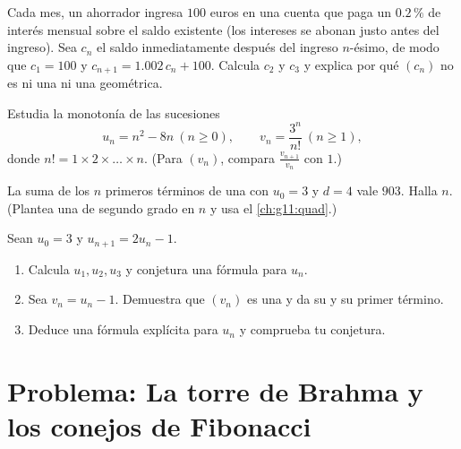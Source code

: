 \begin{exercise}[$\star\star$]\label{exo:g11:seq:8}
Cada mes, un ahorrador ingresa $100$ euros en una cuenta que paga un
$0.2\,\%$ de interés mensual sobre el saldo existente (los intereses se
abonan justo antes del ingreso). Sea $c_n$ el saldo inmediatamente después
del ingreso $n$-ésimo, de modo que $c_1 = 100$ y
$c_{n+1} = 1.002\,c_n + 100$. Calcula $c_2$ y $c_3$ y explica por qué
$(c_n)$ no es ni una  ni una geométrica.
\end{exercise}

\begin{exercise}[$\star\star$]\label{exo:g11:seq:9}
Estudia la monotonía de las sucesiones
\[
u_n = n^2 - 8n \ (n \geq 0), \qquad
v_n = \frac{3^n}{n!}\ (n \geq 1),
\]
donde $n! = 1 \times 2 \times \dots \times n$. (Para $(v_n)$, compara
$\frac{v_{n+1}}{v_n}$ con $1$.)
\end{exercise}

\begin{exercise}[$\star\star$]\label{exo:g11:seq:10}
La suma de los $n$ primeros términos de una  con
$u_0 = 3$ y $d = 4$ vale $903$. Halla $n$. (Plantea una  de
segundo grado en $n$ y usa el \cref{ch:g11:quad}.)
\end{exercise}

\begin{exercise}[$\star\star\star$]\label{exo:g11:seq:11}
Sean $u_0 = 3$ y $u_{n+1} = 2u_n - 1$.
\begin{enumerate}
  \item Calcula $u_1, u_2, u_3$ y conjetura una fórmula para $u_n$.
  \item Sea $v_n = u_n - 1$. Demuestra que $(v_n)$ es una  y da su  y su primer término.
  \item Deduce una fórmula explícita para $u_n$ y comprueba tu conjetura.
\end{enumerate}
\end{exercise}

\section{Problema: La torre de Brahma y los conejos de Fibonacci}

